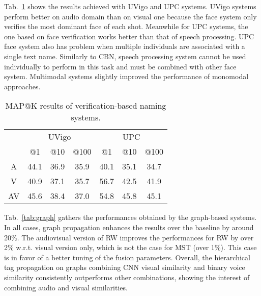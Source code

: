  Tab.~\ref{tab:verification} shows the results achieved with UVigo and UPC systems. UVigo systems perform better on audio domain than on visual one because the face system only verifies the most dominant face of each shot.
%
Meanwhile for UPC systems, the one based on face verification works better than that of speech processing. UPC face system also has problem when multiple individuals are associated with a single text name. Similarly to CBN, speech processing system cannot be used individually to perform in this task and must be combined with other face system.
%
Multimodal systems slightly improved the performance of monomodal approaches.

\begin{table}[tb]
\centering
\caption{MAP@K results of verification-based naming systems.}
\vspace*{-2mm}
\begin{tabular}{c|c|c|c|| c|c|c|}
\cline{2-7}
  &  \multicolumn{3}{|c||}{UVigo} &  \multicolumn{3}{|c|}{UPC} \\ \cline{2-7}
           & @1& @10& @100   & @1& @10& @100 \\ \hline
 \multicolumn{1}{|c|}{A} &  44.1  & 36.9   & 35.9  &  40.1  & 35.1   & 34.7\\ \hline
 \multicolumn{1}{|c|}{V} &  40.9  & 37.1   & 35.7 &  56.7  & 42.5   & 41.9 \\ \hline
 \multicolumn{1}{|c|}{AV} & 45.6 & 38.4 & 37.0 & 54.8 & 45.8 & 45.1 \\ \hline
\end{tabular}
%
\vspace*{-5mm}
\label{tab:verification}
\end{table}

 Tab.~\ref{tab:graph} gathers the performances obtained by the graph-based systems. In all cases, graph propagation enhances the results over the baseline by around 20\%. The audiovisual version of RW improves the performances for RW by over 2\% w.r.t. visual version only, which is not the case for MST (over 1\%). This case is in favor of a better tuning of the fusion parameters.
%
Overall, the hierarchical tag propagation on graphs  combining  CNN  visual  similarity  and  binary  voice similarity consistently outperforms other combinations, showing the interest of combining audio and visual similarities.  


